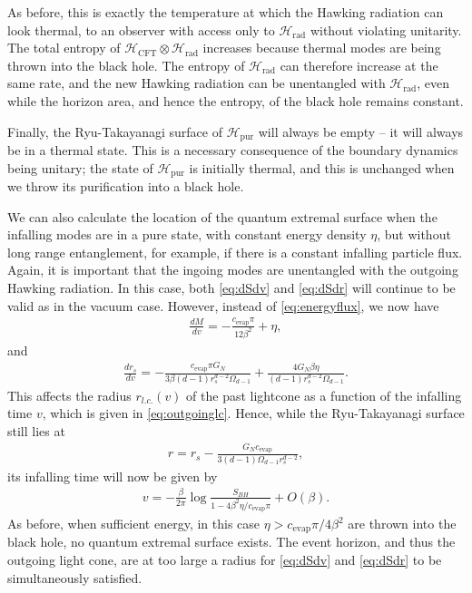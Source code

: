 \documentclass[11pt,a4paper]{article}
\begin{document}
As before, this is exactly the temperature at which the Hawking radiation can look thermal, to an observer with access only to $\mathcal{H}_\text{rad}$ without violating unitarity. The total entropy of $\mathcal{H}_\text{CFT} \otimes \mathcal{H}_\text{rad}$ increases because thermal modes are being thrown into the black hole. The entropy of $\mathcal{H}_\text{rad}$ can therefore increase at the same rate, and the new Hawking radiation can be unentangled with $\mathcal{H}_\text{rad}$, even while the horizon area, and hence the entropy, of the black hole remains constant.

Finally, the Ryu-Takayanagi surface of $\mathcal{H}_\text{pur}$ will always be empty -- it will always be in a thermal state. This is a necessary consequence of the boundary dynamics being unitary; the state of $\mathcal{H}_\text{pur}$ is initially thermal, and this is unchanged when we throw its purification into a black hole.

We can also calculate the location of the quantum extremal surface when the infalling modes are in a pure state, with constant energy density $\eta$, but without long range entanglement, for example, if there is a constant infalling particle flux. Again, it is important that the ingoing modes are unentangled with the outgoing Hawking radiation. In this case, both \eqref{eq:dSdv} and \eqref{eq:dSdr} will continue to be valid as in the vacuum case. However, instead of \eqref{eq:energyflux}, we now have
\begin{align}
\frac{d M}{d v} = - \frac{c_\text{evap} \pi}{12 \beta^2} + \eta,
\end{align}
and
\begin{align}
\frac{d r_s}{d v} = -\frac{c_\text{evap} \pi G_N}{3 \beta (d-1) r_s^{d-2} \Omega_{d-1}} +\frac{4 G_N \beta \eta}{(d-1) r_s^{d-2} \Omega_{d-1}}.
\end{align}
This affects the radius $r_{l.c.}(v)$ of the past lightcone as a function of the infalling time $v$, which is given in \eqref{eq:outgoinglc}. Hence, while the Ryu-Takayanagi surface still lies at
\begin{align}
r = r_s - \frac{G_N c_\text{evap}}{3(d-1)\Omega_{d-1}r_s^{d-2}},
\end{align}
its infalling time will now be given by
\begin{align}
v = -\frac{\beta}{2 \pi} \log \frac{S_{BH}}{1 - 4 \beta^2 \eta/c_\text{evap} \pi } + O(\beta).
\end{align}
As before, when sufficient energy, in this case $\eta > c_\text{evap} \pi /4 \beta^2$ are thrown into the black hole, no quantum extremal surface exists. The event horizon, and thus the outgoing light cone, are at too large a radius for \eqref{eq:dSdv} and \eqref{eq:dSdr}  to be simultaneously satisfied.
\end{document}
